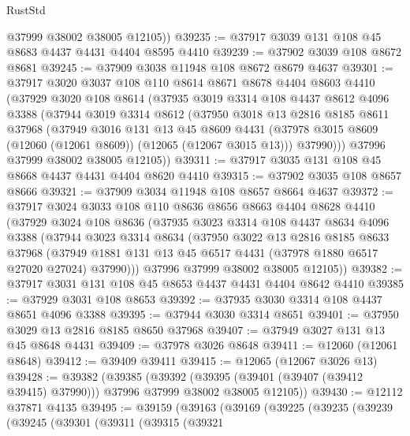 \begin{lexlean}{RustStd}
\begin{coremodule}
        @37999
        @38002
        @38005
        @12105))
@39235 := @37917 @3039 @131 @108 @45 @8683 @4437 @4431 @4404 @8595 @4410
@39239 := @37902 @3039 @108 @8672 @8681
@39245 := @37909 @3038 @11948 @108 @8672 @8679 @4637
@39301 := @37917
    @3020
    @3037
    @108
    @110
    @8614
    @8671
    @8678
    @4404
    @8603
    @4410
    (@37929
      @3020
      @108
      @8614
      (@37935
        @3019
        @3314
        @108
        @4437
        @8612
        @4096
        @3388
        (@37944
          @3019
          @3314
          @8612
          (@37950
            @3018
            @13
            @2816
            @8185
            @8611
            @37968
            (@37949
              @3016
              @131
              @13
              @45
              @8609
              @4431
              (@37978 @3015 @8609 (@12060 (@12061 @8609)) (@12065 (@12067 @3015 @13)))
              @37990)))
        @37996
        @37999
        @38002
        @38005
        @12105))
@39311 := @37917 @3035 @131 @108 @45 @8668 @4437 @4431 @4404 @8620 @4410
@39315 := @37902 @3035 @108 @8657 @8666
@39321 := @37909 @3034 @11948 @108 @8657 @8664 @4637
@39372 := @37917
    @3024
    @3033
    @108
    @110
    @8636
    @8656
    @8663
    @4404
    @8628
    @4410
    (@37929
      @3024
      @108
      @8636
      (@37935
        @3023
        @3314
        @108
        @4437
        @8634
        @4096
        @3388
        (@37944
          @3023
          @3314
          @8634
          (@37950
            @3022
            @13
            @2816
            @8185
            @8633
            @37968
            (@37949 @1881 @131 @13 @45 @6517 @4431 (@37978 @1880 @6517 @27020 @27024) @37990)))
        @37996
        @37999
        @38002
        @38005
        @12105))
@39382 := @37917 @3031 @131 @108 @45 @8653 @4437 @4431 @4404 @8642 @4410
@39385 := @37929 @3031 @108 @8653
@39392 := @37935 @3030 @3314 @108 @4437 @8651 @4096 @3388
@39395 := @37944 @3030 @3314 @8651
@39401 := @37950 @3029 @13 @2816 @8185 @8650 @37968
@39407 := @37949 @3027 @131 @13 @45 @8648 @4431
@39409 := @37978 @3026 @8648
@39411 := @12060 (@12061 @8648)
@39412 := @39409 @39411
@39415 := @12065 (@12067 @3026 @13)
@39428 := @39382
    (@39385
      (@39392 (@39395 (@39401 (@39407 (@39412 @39415) @37990))) @37996 @37999 @38002 @38005 @12105))
@39430 := @12112 @37871 @4135
@39495 := @39159
    (@39163
      (@39169
        (@39225
          (@39235
            (@39239
              (@39245
                (@39301
                  (@39311
                    (@39315
                      (@39321

\end{coremodule}
\end{lexlean}
